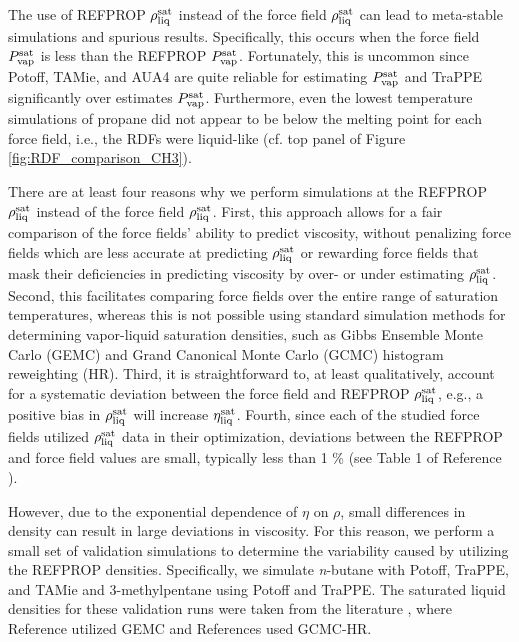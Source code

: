 \documentclass[preprint,review,12pt]{elsarticle}
\begin{document}
	The use of REFPROP $\rho_{\rm liq}^{\rm sat}$ instead of the force field $\rho_{\rm liq}^{\rm sat}$ can lead to meta-stable simulations and spurious results. Specifically, this occurs when the force field $P_{\rm vap}^{\rm sat}$ is less than the REFPROP $P_{\rm vap}^{\rm sat}$. Fortunately, this is uncommon since Potoff, TAMie, and AUA4 are quite reliable for estimating $P_{\rm vap}^{\rm sat}$ and TraPPE significantly over estimates $P_{\rm vap}^{\rm sat}$. Furthermore, even the lowest temperature simulations of propane did not appear to be below the melting point for each force field, i.e., the RDFs were liquid-like (cf. top panel of Figure \ref{fig:RDF_comparison_CH3}). 
	
	There are at least four reasons why we perform simulations at the REFPROP $\rho_{\rm liq}^{\rm sat}$ instead of the force field $\rho_{\rm liq}^{\rm sat}$. First, this approach allows for a fair comparison of the force fields' ability to predict viscosity, without penalizing force fields which are less accurate at predicting $\rho_{\rm liq}^{\rm sat}$ or rewarding force fields that mask their deficiencies in predicting viscosity by over- or under estimating $\rho_{\rm liq}^{\rm sat}$.
	Second, this facilitates comparing force fields over the entire range of saturation temperatures, whereas this is not possible using standard simulation methods for determining vapor-liquid saturation densities, such as Gibbs Ensemble Monte Carlo (GEMC) and Grand Canonical Monte Carlo (GCMC) histogram reweighting (HR). Third, it is straightforward to, at least qualitatively, account for a systematic deviation between the force field and REFPROP $\rho_{\rm liq}^{\rm sat}$, e.g., a positive bias in $\rho_{\rm liq}^{\rm sat}$ will increase $\eta_{\rm liq}^{\rm sat}$. Fourth, since each of the studied force fields utilized $\rho_{\rm liq}^{\rm sat}$ data in their optimization, deviations between the REFPROP and force field values are small, typically less than 1 \% (see Table 1 of Reference ). 
	
	However, due to the exponential dependence of $\eta$ on $\rho$, small differences in density can result in large deviations in viscosity. For this reason, we perform a small set of validation simulations to determine the variability caused by utilizing the REFPROP densities. Specifically, we simulate \textit{n}-butane with Potoff, TraPPE, and TAMie and 3-methylpentane using Potoff and TraPPE. The saturated liquid densities for these validation runs were taken from the literature \cite{Mie,Martin1999,Potoff_branched,TAMie}, where Reference  utilized GEMC and References \cite{Mie,Potoff_branched,TAMie} used GCMC-HR.      
	
\end{document}
